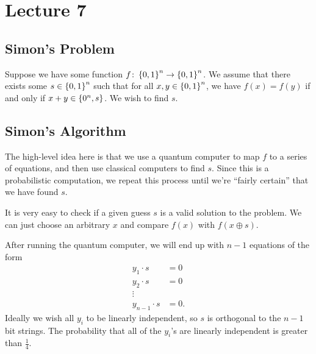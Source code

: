 \documentclass[class=article, crop=false]{standalone}
\begin{document}
  \section{Lecture 7}
  \subsection{Simon's Problem}
  Suppose we have some function $f\colon \left\{0, 1\right\}^n\to \left\{0, 1\right\}^n$. We assume that there exists some $s\in\left\{0, 1\right\}^n$ such that for all $x, y\in \left\{0, 1\right\}^n$, we have $f(x) = f(y)$ if and only if $x + y\in \left\{0^n, s\right\}$. We wish to find $s$.
  \subsection{Simon's Algorithm}
  The high-level idea here is that we use a quantum computer to map $f$ to a series of equations, and then use classical computers to find $s$. Since this is a probabilistic computation, we repeat this process until we're ``fairly certain'' that we have found $s$.
  \begin{note}{}
    It is very easy to check if a given guess $s$ is a valid solution to the problem. We can just choose an arbitrary $x$ and compare $f(x)$ with $f(x\oplus s)$.
  \end{note}
  After running the quantum computer, we will end up with $n - 1$ equations of the form
  \begin{align*}
    y_1\cdot s &= 0 \\
    y_2\cdot s &= 0 \\
    \vdots \\
    y_{n - 1}\cdot s &= 0.
  \end{align*}
  Ideally we wish all $y_i$ to be linearly independent, so $s$ is orthogonal to the $n - 1$ bit strings. The probability that all of the $y_i$'s are linearly independent is greater than $\frac{1}{4}$.
\end{document}
